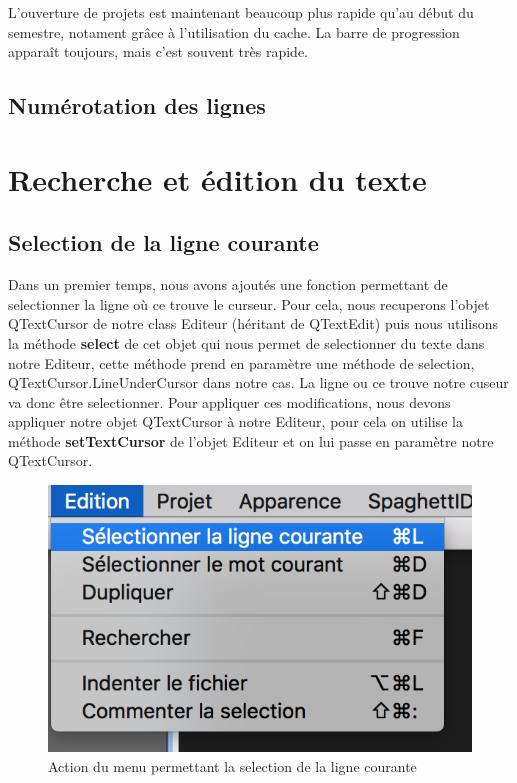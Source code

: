\documentclass[a4paper,12pt]{article}
\begin{document}
		L'ouverture de projets est maintenant beaucoup plus rapide qu'au début du semestre, notament grâce à l'utilisation du cache. La barre de progression apparaît toujours, mais c'est souvent très rapide.
		
	\subsection{Numérotation des lignes}
		
		
\section{Recherche et édition du texte}

	\subsection{Selection de la ligne courante}

	Dans un premier temps, nous avons ajoutés une fonction permettant de selectionner la ligne où ce trouve le curseur.
	Pour cela, nous recuperons l'objet QTextCursor de notre class Editeur (héritant de QTextEdit) puis nous utilisons la méthode \textbf{select} de cet objet qui nous permet de selectionner du texte dans notre Editeur, cette méthode prend en paramètre une méthode de selection, QTextCursor.LineUnderCursor dans notre cas. La ligne ou ce trouve notre cuseur va donc être selectionner.
	Pour appliquer ces modifications, nous devons appliquer notre objet QTextCursor à notre Editeur, pour cela on utilise la méthode \textbf{setTextCursor} de l'objet Editeur et on lui passe en paramètre notre QTextCursor.  


	\begin{figure}[h!]
		\begin{center}
			\includegraphics[scale=0.8]{images/imgs_edit/utilisation_selection_ligne}
			\caption{Action du menu permettant la selection de la ligne courante}
		\end{center}
	\end{figure}
\end{document}
